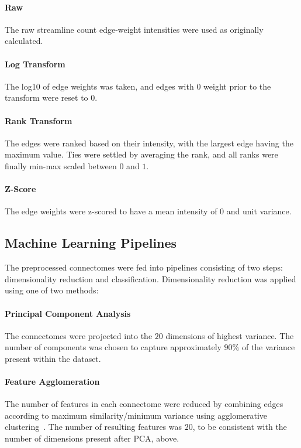 \documentclass[10pt]{SelfArx} %
\begin{document}
\paragraph{Raw} The raw streamline count edge-weight intensities were used as originally calculated.

\paragraph{Log Transform} The log10 of edge weights was taken, and edges with $0$ weight prior to the transform were
reset to $0$.

\paragraph{Rank Transform} The edges were ranked based on their intensity, with the largest edge having the maximum
value. Ties were settled by averaging the rank, and all ranks were finally min-max scaled between $0$ and $1$.

\paragraph{Z-Score} The edge weights were z-scored to have a mean intensity of $0$ and unit variance.

\subsection*{Machine Learning Pipelines}

The preprocessed connectomes were fed into pipelines consisting of two steps: dimensionality reduction and
classification. Dimensionality reduction was applied using one of two methods:

\paragraph{Principal Component Analysis} The connectomes were projected into the $20$ dimensions of highest variance.
The number of components was chosen to capture approximately $90\%$ of the variance present within the dataset.

\paragraph{Feature Agglomeration} The number of features in each connectome were reduced by combining edges according
to maximum similarity/minimum variance using agglomerative clustering~\cite{Ward1963-uh}. The number of resulting
features was $20$, to be consistent with the number of dimensions present after PCA, above.
\end{document}
